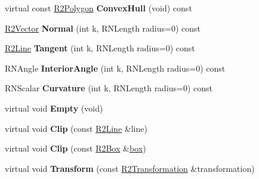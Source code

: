 \begin{DoxyCompactItemize}
\item 
virtual const \hyperlink{class_r2_polygon}{R2\+Polygon} {\bfseries Convex\+Hull} (void) const \hypertarget{class_r2_polygon_ac5957c925e61a5b8fafd17b0466ec67a}{}\label{class_r2_polygon_ac5957c925e61a5b8fafd17b0466ec67a}

\item 
\hyperlink{class_r2_vector}{R2\+Vector} {\bfseries Normal} (int k, R\+N\+Length radius=0) const \hypertarget{class_r2_polygon_a8bdda2e17a82a39fdb2221996b9e9597}{}\label{class_r2_polygon_a8bdda2e17a82a39fdb2221996b9e9597}

\item 
\hyperlink{class_r2_line}{R2\+Line} {\bfseries Tangent} (int k, R\+N\+Length radius=0) const \hypertarget{class_r2_polygon_a9185d9625f6ac10dc24f5ace5dd065c6}{}\label{class_r2_polygon_a9185d9625f6ac10dc24f5ace5dd065c6}

\item 
R\+N\+Angle {\bfseries Interior\+Angle} (int k, R\+N\+Length radius=0) const \hypertarget{class_r2_polygon_a66db59be3f747f216229d72d9d490fd8}{}\label{class_r2_polygon_a66db59be3f747f216229d72d9d490fd8}

\item 
R\+N\+Scalar {\bfseries Curvature} (int k, R\+N\+Length radius=0) const \hypertarget{class_r2_polygon_aa94089e8c8c5d09c5aecd84246a8e06d}{}\label{class_r2_polygon_aa94089e8c8c5d09c5aecd84246a8e06d}

\item 
virtual void {\bfseries Empty} (void)\hypertarget{class_r2_polygon_ab48ad97e382c682890b611c0185dc23b}{}\label{class_r2_polygon_ab48ad97e382c682890b611c0185dc23b}

\item 
virtual void {\bfseries Clip} (const \hyperlink{class_r2_line}{R2\+Line} \&line)\hypertarget{class_r2_polygon_ae6af365707687206ac4c895f1a81f84d}{}\label{class_r2_polygon_ae6af365707687206ac4c895f1a81f84d}

\item 
virtual void {\bfseries Clip} (const \hyperlink{class_r2_box}{R2\+Box} \&\hyperlink{structbox}{box})\hypertarget{class_r2_polygon_aaf0a2b241cf4f0fd3a48878adf9f69a6}{}\label{class_r2_polygon_aaf0a2b241cf4f0fd3a48878adf9f69a6}

\item 
virtual void {\bfseries Transform} (const \hyperlink{class_r2_transformation}{R2\+Transformation} \&transformation)\hypertarget{class_r2_polygon_a378acd8a6055e8c93c37fa7c2b0f7e04}{}\label{class_r2_polygon_a378acd8a6055e8c93c37fa7c2b0f7e04}


\end{DoxyCompactItemize}
